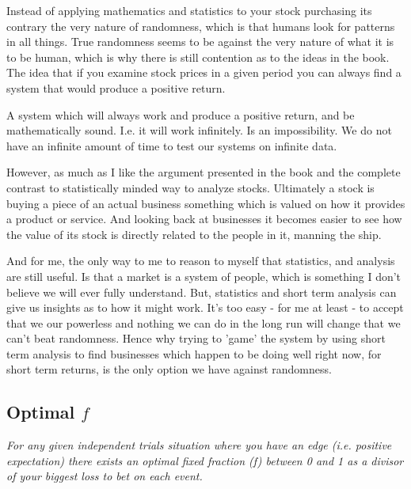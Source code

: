 \documentclass[12pt]{article}
\begin{document}
    Instead of applying mathematics and statistics to your stock purchasing its contrary the 
    very nature of randomness, which is that humans look for patterns in all things. True 
    randomness seems to be against the very nature of what it is to be human, which is why
    there is still contention as to the ideas in the book. The idea that if you examine stock
    prices in a given period you can always find a system that would produce a positive return.

    A system which will always work and produce a positive return, and be mathematically sound. 
    I.e. it will work infinitely. Is an impossibility. We do not have an infinite amount of
    time to test our systems on infinite data.

    However, as much as I like the argument presented in the book and the complete contrast to 
    statistically minded way to analyze stocks. Ultimately a stock is buying a piece of an 
    actual business something which is valued on how it provides a product or service. And 
    looking back at businesses it becomes easier to see how the value of its stock is directly 
    related to the people in it, manning the ship.

    And for me, the only way to me to reason to myself that statistics, and analysis are still 
    useful. Is that a market is a system of people, which is something I don't believe we will 
    ever fully understand. But, statistics and short term analysis can give us insights as to 
    how it might work. It's too easy - for me at least - to accept that we our powerless and 
    nothing we can do in the long run will change that we can't beat randomness. Hence why
    trying to 'game' the system by using short term analysis to find businesses which happen
    to be doing well right now, for short term returns, is the only option we have against
    randomness.

\subsection{Optimal \(f\)}

    \begin{displayquote} \textit {
        For any given independent trials situation where you have an edge (i.e. positive 
        expectation) there exists an optimal fixed
        fraction (f) between 0 and 1 as a divisor of your biggest loss to bet on each event.
    } \end{displayquote}
\end{document}
